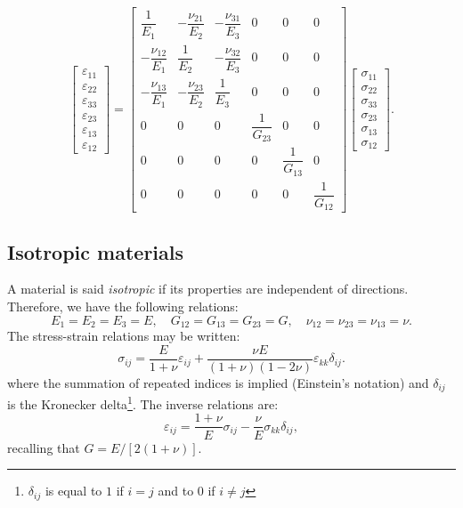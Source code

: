 \begin{equation}
\label{chap2:orthotropic2}
	\begin{bmatrix}
		\varepsilon_{11} \\
		\varepsilon_{22} \\
		\varepsilon_{33} \\
		\varepsilon_{23} \\
		\varepsilon_{13} \\
		\varepsilon_{12}
	\end{bmatrix}
= 
	\begin{bmatrix}
		\dfrac{1}{E_1} & -\dfrac{\nu_{21}}{E_2} & -\dfrac{\nu_{31}}{E_3} &       0       &       0       &       0 \\
		-\dfrac{\nu_{12}}{E_1} & \dfrac{1}{E_2} & -\dfrac{\nu_{32}}{E_3} &       0       &       0       &       0 \\
		-\dfrac{\nu_{13}}{E_1} & -\dfrac{\nu_{23}}{E_2} & \dfrac{1}{E_3} &       0       &       0       &       0 \\
		      0       &        0     &        0       & \dfrac{1}{G_{23}} &       0       &       0 \\
		      0       &        0     &        0       &       0       & \dfrac{1}{G_{13}}&       0 \\
		      0       &        0     &        0       &       0       &       0       & \dfrac{1}{G_{12}}
	\end{bmatrix}
	\begin{bmatrix}
		\sigma_{11} \\
		\sigma_{22} \\
		\sigma_{33} \\
		\sigma_{23} \\
		\sigma_{13} \\
		\sigma_{12}
	\end{bmatrix}
	.
\end{equation}

	\subsection{Isotropic materials} \label{chap2:isotropic}
A material is said \emph{isotropic} if its properties are independent of directions. Therefore, we have the following relations:
\begin{equation}
E_1 = E_2 = E_3 = E, \quad G_{12} = G_{13} = G_{23} = G, \quad \nu_{12} = \nu_{23} = \nu_{13} = \nu.
\end{equation}
The stress-strain relations may be written:
\begin{equation}
\sigma_{ij} = \frac{E}{1+\nu} \varepsilon_{ij} + \frac{\nu E}{(1+\nu)(1-2\nu)} \varepsilon_{kk}\delta_{ij}.
\end{equation}	
where the summation of repeated indices is implied (Einstein's notation) and $\delta_{ij}$ is the Kronecker delta\footnote{$ \delta_{ij}$ is equal to $1$ if $i = j$ and to $0$ if $i \neq j$}. The inverse relations are:
\begin{equation}
\varepsilon_{ij} = \frac{1+\nu}{E} \sigma_{ij} - \frac{\nu}{E} \sigma_{kk} \delta_{ij},
\end{equation}
recalling that $G = E/[2(1+\nu)]$.
	
